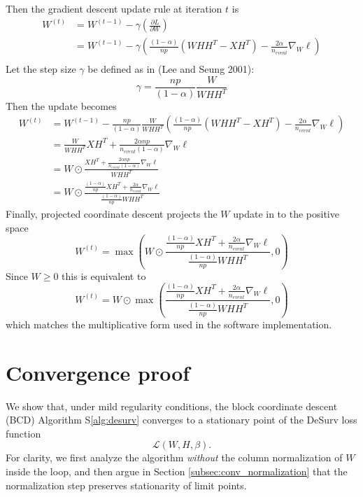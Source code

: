 \documentclass[
]{article}
\begin{document}
Then the gradient descent update rule at iteration \(t\) is
\begin{align}
  W^{(t)} &= W^{(t-1)} - \gamma \left( \frac{\partial L}{\partial W} \right) \nonumber \\
          &= W^{(t-1)} - \gamma \left( \frac{(1-\alpha)}{np}\left( WHH^T - XH^T \right) - \frac{2\alpha}{n_{event}} \nabla_W \ell \right)\\
\end{align} Let the step size \(\gamma\) be defined as in (Lee and Seung
2001): \begin{equation}
  \gamma = \frac{np}{(1-\alpha)}\frac{W}{WHH^T}
\end{equation} Then the update becomes \begin{align}
  W^{(t)} &= W^{(t-1)} -\frac{np}{(1-\alpha)}\frac{W}{WHH^T} \left( \frac{(1-\alpha)}{np}\left( WHH^T - XH^T \right) - \frac{2\alpha}{n_{event}} \nabla_W \ell \right) \nonumber \\
          &= \frac{W}{WHH^T} XH^T + \frac{2\alpha np}{n_{event}(1-\alpha)} \nabla_W \ell \nonumber \\
          &= W \odot \frac{XH^T + \frac{2\alpha np}{n_{event}(1-\alpha)} \nabla_W \ell }{WHH^T} \nonumber \\
          &= W \odot \frac{\frac{(1-\alpha)}{np} XH^T + \frac{2\alpha}{n_{event}} \nabla_W \ell}{\frac{(1-\alpha)}{np} WHH^T}
\end{align} Finally, projected coordinate descent projects the \(W\)
update in to the positive space \begin{equation}
  W^{(t)} =  \max \left(W \odot \frac{\frac{(1-\alpha)}{np} XH^T + \frac{2\alpha}{n_{event}} \nabla_W \ell}{\frac{(1-\alpha)}{np}WHH^T}, 0\right)
\end{equation} Since \(W \geq 0\) this is equivalent to \begin{equation}
  W^{(t)} =  W \odot \max \left( \frac{\frac{(1-\alpha)}{np} XH^T + \frac{2\alpha}{n_{event}} \nabla_W \ell}{\frac{(1-\alpha)}{np} WHH^T}, 0 \right)
\end{equation} which matches the multiplicative form used in the
software implementation.

\section{Convergence proof}

We show that, under mild regularity conditions, the block coordinate
descent (BCD) Algorithm S\ref{alg:desurv} converges to a stationary
point of the DeSurv loss function \[
\mathcal{L}(W,H,\beta).
\] For clarity, we first analyze the algorithm \emph{without} the column
normalization of \(W\) inside the loop, and then argue in Section
\ref{subsec:conv_normalization} that the normalization step preserves
stationarity of limit points.
\end{document}
